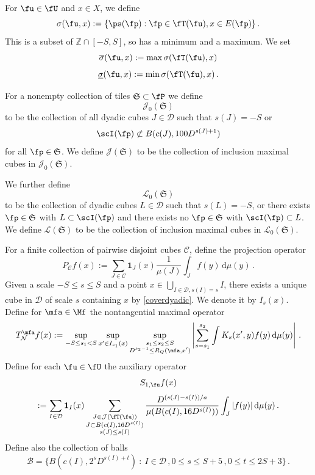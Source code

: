 For $\fu \in \fU$ and $x\in X$, we define
$$
    \sigma (\fu, x):=\{\ps(\fp):\fp\in \fT(\fu), x\in E(\fp)\}\,.
$$
This is a subset of $\mathbb{Z} \cap [-S, S]$, so has a minimum and a maximum. We set
$$
    \overline{\sigma} (\fu, x) := \max \sigma(\fT(\fu), x)
$$
$$
    \underline{\sigma} (\fu, x) := \min\sigma(\fT(\fu), x)\,.
$$



For a nonempty collection of tiles $\mathfrak{S} \subset \fP$ we define
$$
    \mathcal{J}_0(\mathfrak{S})
$$
to be the collection of all dyadic cubes $J \in \mathcal{D}$ such that $s(J) = -S$ or
$$
    \scI(\fp) \not\subset B(c(J), 100D^{s(J) + 1})
$$
for all $\fp \in \mathfrak{S}$. We define $\mathcal{J}(\mathfrak{S})$ to be the collection of inclusion maximal cubes in $\mathcal{J}_0(\mathfrak{S})$.

We further define
$$
    \mathcal{L}_0(\mathfrak{S})
$$
to be the collection of dyadic cubes $L \in \mathcal{D}$ such that $s(L) = -S$, or there exists $\fp \in \mathfrak{S}$ with $L \subset \scI(\fp)$ and there exists no $\fp \in \mathfrak{S}$ with $\scI(\fp) \subset L$. We define $\mathcal{L}(\mathfrak{S})$ to be the collection of inclusion maximal cubes in $\mathcal{L}_0(\mathfrak{S})$.




For a finite collection of pairwise disjoint cubes $\mathcal{C}$, define the projection operator
$$
    P_{\mathcal{C}}f(x) :=\sum_{J\in\mathcal{C}}\mathbf{1}_J(x) \frac{1}{\mu(J)}\int_J f(y) \, \mathrm{d}\mu(y)\,.
$$
Given a scale $-S \le s\le S$ and a point $x \in \bigcup_{I\in \mathcal{D}, s(I) = s} I$, there exists a unique cube in $\mathcal{D}$ of scale $s$ containing $x$ by \eqref{coverdyadic}. We denote it by $I_s(x)$. Define for $\mfa \in \Mf$ the nontangential maximal operator
\begin{equation}
    \label{eq-TN-def}
    T_{\mathcal{N}}^\mfa f(x) := \sup_{-S \le s_1 < S} \sup_{x' \in I_{s_1}(x)} \sup_{\substack{s_1 \le s_2 \le S\\ D^{s_2-1} \le R_Q(\mfa, x')}} \left| \sum_{s = s_1}^{s_2} \int K_s(x',y) f(y) \, \mathrm{d}\mu(y) \right|\,.
\end{equation}
Define for each $\fu \in \fU$ the auxiliary operator
$$
    S_{1,\fu}f(x)
$$
\begin{equation}
    \label{eq-def-S-op}
    :=\sum_{I\in\mathcal{D}} \mathbf{1}_{I}(x) \sum_{\substack{J\in \mathcal{J}(\fT(\fu))\\
    J\subset B(c(I), 16 D^{s(I)})\\ s(J) \le s(I)}} \frac{D^{(s(J) - s(I))/a}}{\mu(B(c(I), 16D^{s(I)}))}\int_J |f(y)| \, \mathrm{d}\mu(y)\,.
\end{equation}
Define also the collection of balls
$$
    \mathcal{B} = \{B(c(I), 2^s D^{s(I)+t}) \ : \ I \in \mathcal{D}\,, 0 \le s \le S + 5\,, 0 \le t \le 2S+3\}\,.
$$

